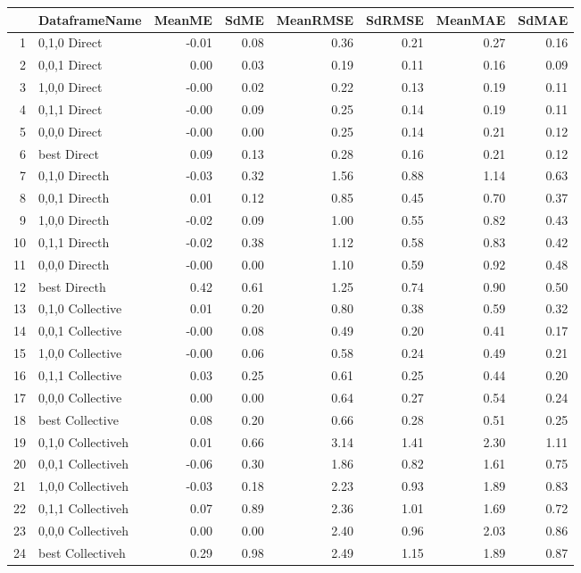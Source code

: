 \begin{table}[ht]
\centering
\begin{tabular}{rlrrrrrr}
  \hline
 & DataframeName & MeanME & SdME & MeanRMSE & SdRMSE & MeanMAE & SdMAE \\ 
  \hline
1 & 0,1,0 Direct & -0.01 & 0.08 & 0.36 & 0.21 & 0.27 & 0.16 \\ 
  2 & 0,0,1 Direct & 0.00 & 0.03 & 0.19 & 0.11 & 0.16 & 0.09 \\ 
  3 & 1,0,0 Direct & -0.00 & 0.02 & 0.22 & 0.13 & 0.19 & 0.11 \\ 
  4 & 0,1,1 Direct & -0.00 & 0.09 & 0.25 & 0.14 & 0.19 & 0.11 \\ 
  5 & 0,0,0 Direct & -0.00 & 0.00 & 0.25 & 0.14 & 0.21 & 0.12 \\ 
  6 & best Direct & 0.09 & 0.13 & 0.28 & 0.16 & 0.21 & 0.12 \\ 
  7 & 0,1,0 Directh & -0.03 & 0.32 & 1.56 & 0.88 & 1.14 & 0.63 \\ 
  8 & 0,0,1 Directh & 0.01 & 0.12 & 0.85 & 0.45 & 0.70 & 0.37 \\ 
  9 & 1,0,0 Directh & -0.02 & 0.09 & 1.00 & 0.55 & 0.82 & 0.43 \\ 
  10 & 0,1,1 Directh & -0.02 & 0.38 & 1.12 & 0.58 & 0.83 & 0.42 \\ 
  11 & 0,0,0 Directh & -0.00 & 0.00 & 1.10 & 0.59 & 0.92 & 0.48 \\ 
  12 & best Directh & 0.42 & 0.61 & 1.25 & 0.74 & 0.90 & 0.50 \\ 
  13 & 0,1,0 Collective & 0.01 & 0.20 & 0.80 & 0.38 & 0.59 & 0.32 \\ 
  14 & 0,0,1 Collective & -0.00 & 0.08 & 0.49 & 0.20 & 0.41 & 0.17 \\ 
  15 & 1,0,0 Collective & -0.00 & 0.06 & 0.58 & 0.24 & 0.49 & 0.21 \\ 
  16 & 0,1,1 Collective & 0.03 & 0.25 & 0.61 & 0.25 & 0.44 & 0.20 \\ 
  17 & 0,0,0 Collective & 0.00 & 0.00 & 0.64 & 0.27 & 0.54 & 0.24 \\ 
  18 & best Collective & 0.08 & 0.20 & 0.66 & 0.28 & 0.51 & 0.25 \\ 
  19 & 0,1,0 Collectiveh & 0.01 & 0.66 & 3.14 & 1.41 & 2.30 & 1.11 \\ 
  20 & 0,0,1 Collectiveh & -0.06 & 0.30 & 1.86 & 0.82 & 1.61 & 0.75 \\ 
  21 & 1,0,0 Collectiveh & -0.03 & 0.18 & 2.23 & 0.93 & 1.89 & 0.83 \\ 
  22 & 0,1,1 Collectiveh & 0.07 & 0.89 & 2.36 & 1.01 & 1.69 & 0.72 \\ 
  23 & 0,0,0 Collectiveh & 0.00 & 0.00 & 2.40 & 0.96 & 2.03 & 0.86 \\ 
  24 & best Collectiveh & 0.29 & 0.98 & 2.49 & 1.15 & 1.89 & 0.87 \\ 
   \hline
\end{tabular}
\end{table}
